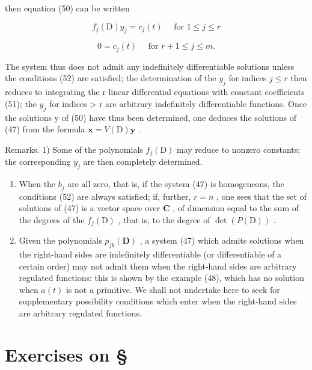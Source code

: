 then equation (50) can be written

\[
f _ {j} (\mathrm{D}) y _ {j} = c _ {j} (t) \quad \text {   for   } 1 \leqslant j \leqslant r\tag{51}
\]

\[
0 = c _ {j} (t) \quad \text {   for   } r + 1 \leqslant j \leqslant m.\tag{52}
\]

The system thus does not admit any indefinitely differentiable solutions unless the conditions (52) are satisfied; the determination of the \(y_{j}\) for indices \(j \leqslant r\) then reduces to integrating the r linear differential equations with constant coefficients (51); the \(y_{j}\) for indices \textgreater{} r are arbitrary indefinitely differentiable functions. Once the solutions y of (50) have thus been determined, one deduces the solutions of (47) from the formula \(\mathbf{x} = V(\mathrm{D})\mathbf{y}\) .

Remarks. 1) Some of the polynomials \(f_{j}(\mathrm{D})\) may reduce to nonzero constants; the corresponding \(y_{j}\) are then completely determined.

\begin{enumerate}
\def\labelenumi{\arabic{enumi})}
\setcounter{enumi}{1}
\item
  When the \(b_{j}\) are all zero, that is, if the system (47) is homogeneous, the conditions (52) are always satisfied; if, further, \(r = n\) , one sees that the set of solutions of (47) is a vector space over \(\mathbf{C}\) , of dimension equal to the sum of the degrees of the \(f_{j}(\mathrm{D})\) , that is, to the degree of \(\det(P(\mathrm{D}))\) .
\item
  Given the polynomials \(p_{jk}(\mathbf{D})\) , a system (47) which admits solutions when the right-hand sides are indefinitely differentiable (or differentiable of a certain order) may not admit them when the right-hand sides are arbitrary regulated functions: this is shown by the example (48), which has no solution when \(a(t)\) is not a primitive. We shall not undertake here to seek for supplementary possibility conditions which enter when the right-hand sides are arbitrary regulated functions.
\end{enumerate}

\setcounter{exercisegroup}{0}
\section*{Exercises on \S{}}
{}

